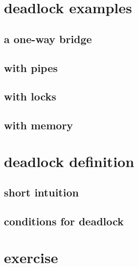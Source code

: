 \graphicspath{{./figures/}}
\title{}
\date{}

\begin{frame}
    \titlepage
\end{frame}



\section{deadlock examples}

\subsection{a one-way bridge}


\subsection{with pipes}


\subsection{with locks}


\subsection{with memory}

 
\section{deadlock definition}

\subsection{short intuition}



\subsection{conditions for deadlock}



\section{exercise}

